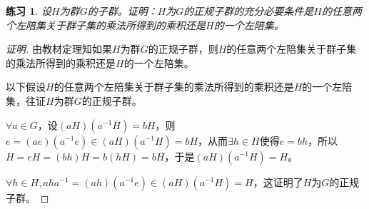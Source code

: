 \documentclass{article}
\newtheorem{Exercise}{练习}
\begin{document}
\begin{CJK*}{UTF8}{gbsn}
\begin{Exercise}
  设$H$为群$G$的子群。证明：$H$为$G$的正规子群的充分必要条件是$H$的任意两个左陪集关于群子集的乘法所得到的乘积还是$H$的一个左陪集。
\end{Exercise}
\begin{proof}[证明]
  由教材定理知如果$H$为群$G$的正规子群，则$H$的任意两个左陪集关于群子集的乘法所得到的乘积还是$H$的一个左陪集。

  以下假设$H$的任意两个左陪集关于群子集的乘法所得到的乘积还是$H$的一个左陪集，往证$H$为群$G$的正规子群。

  $\forall a\in G$，设$(aH)(a^{-1}H)=bH$，则$e=(ae)(a^{-1}e)\in (aH)(a^{-1}H)=bH$，从而$\exists h\in H$使得$e=bh$，所以$H=eH=(bh)H=b(hH)=bH$，于是$(aH)(a^{-1}H)=H$。

$\forall h\in H, aha^{-1}=(ah)(a^{-1}e)\in (aH)(a^{-1}H)=H$，这证明了$H$为$G$的正规子群。
\end{proof}
\end{CJK*}
\end{document}
